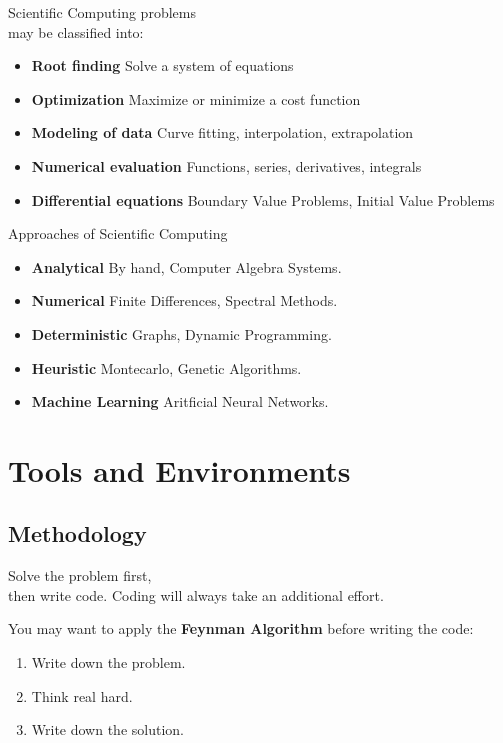 \documentclass[xcolor={dvipsnames}]{beamer}
\begin{document}
\begin{frame}{Scientific Computing problems\\ may be classified into:}{}
\begin{itemize}[<+->]
\item \textbf{Root finding} Solve a system of equations
\item \textbf{Optimization} Maximize or minimize a cost function
\item \textbf{Modeling of data} Curve fitting, interpolation, extrapolation
\item \textbf{Numerical evaluation} Functions, series, derivatives, integrals
\item \textbf{Differential equations} Boundary Value Problems, Initial Value Problems
\end{itemize}
\end{frame}

\begin{frame}{Approaches of Scientific Computing}{}
\begin{itemize}[<+->]
	\item \textbf{Analytical} By hand, Computer Algebra Systems.
	\item \textbf{Numerical} Finite Differences, Spectral Methods.
	\item \textbf{Deterministic} Graphs, Dynamic Programming.
	\item \textbf{Heuristic} Montecarlo, Genetic Algorithms.
	\item \textbf{Machine Learning} Aritficial Neural Networks.
\end{itemize}
\end{frame}


\section{Tools and Environments}

\subsection{Methodology}

\begin{frame}{Solve the problem first,\\ then write code.}{}
Coding will always take an additional effort.

\pause
\bigskip
You may want to apply the \textbf{Feynman Algorithm} before writing the code:
\begin{enumerate}[<+(1)->]
\item Write down the problem.
\item Think real hard.
\item Write down the solution.
\end{enumerate}
\end{frame}
\end{document}

